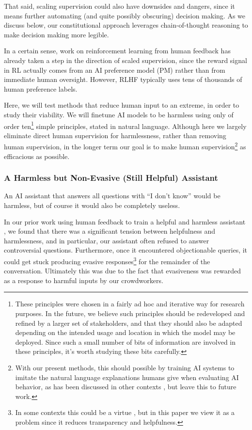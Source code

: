 That said, scaling supervision could also have downsides and dangers, since it means further automating (and quite possibly obscuring) decision making. As we discuss below, our constitutional approach leverages chain-of-thought reasoning \cite{ScratchPad, ChainOfThought} to make decision making more legible.  

In a certain sense, work on reinforcement learning from human feedback \cite{stiennon2020learning, bai2022training, InstructGPT} has already taken a step in the direction of scaled supervision, since the reward signal in RL actually comes from an AI preference model (PM) rather than from immediate human oversight. However, RLHF typically uses tens of thousands of human preference labels.  

Here, we will test methods that reduce human input to an extreme, in order to study their viability.  We will finetune AI models to be harmless  using only of order ten\footnote{These principles were chosen in a fairly ad hoc and iterative way for research purposes. In the future, we believe such principles should be redeveloped and refined by a larger set of stakeholders, and that they should also be adapted depending on the intended usage and location in which the model may be deployed. Since such a small number of bits of information are involved in these principles, it's worth studying these bits  carefully.} simple principles, stated in natural language.  Although here we largely eliminate direct human supervision for harmlessness, rather than removing human supervision, in the longer term our goal is to make human supervision\footnote{With our present methods, this should possible by training AI systems to imitate the natural language explanations humans give when evaluating AI behavior, as has been discussed in other contexts  \cite{PerezLanguageFeedback, OAISelfCritique}, but leave this to future work.} as efficacious as possible.  

\subsubsection*{A Harmless but Non-Evasive (Still Helpful) Assistant}

An AI assistant that answers all questions with ``I don't know'' would be harmless, but of course it would also be completely useless.  

In our prior work using human feedback to train a helpful and harmless assistant \cite{bai2022training}, we found that there was a significant tension between helpfulness and harmlessness, and in particular, our assistant often refused to answer controversial questions.  Furthermore, once it encountered objectionable queries, it could get stuck producing evasive responses\footnote{In some contexts this could be a virtue \cite{BAD}, but in this paper we view it as a problem since it reduces transparency and helpfulness.} for the remainder of the conversation.  Ultimately this was due to the fact that evasiveness was rewarded as a response to harmful inputs by our crowdworkers. 

